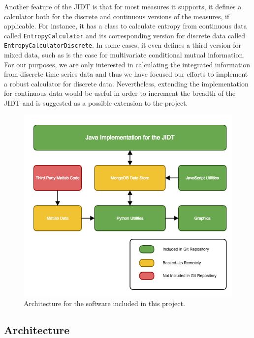 \documentclass[a4paper,11pt]{article}
\begin{document}
Another feature of the JIDT is that for most measures it supports, it defines a calculator both for the discrete and continuous versions of the measures, if applicable. For instance, it has a class to calculate entropy from continuous data called \texttt{EntropyCalculator} and its corresponding version for discrete data called \texttt{EntropyCalculatorDiscrete}. In some cases, it even defines a third version for mixed data, such as is the case for multivariate conditional mutual information. For our purposes, we are only interested in calculating the integrated information from discrete time series data and thus we have focused our efforts to implement a robust calculator for discrete data. Nevertheless, extending the implementation for continuous data would be useful in order to increment the breadth of the JIDT and is suggested as a possible extension to the project.

\begin{figure}[H]
\begin{center}
\includegraphics[scale = 0.5]{figures/architecture}
\caption{
	Architecture for the software included in this project.
	\label{fig:architecture}
}
\end{center}
\end{figure}

\subsection{Architecture}
\end{document}
